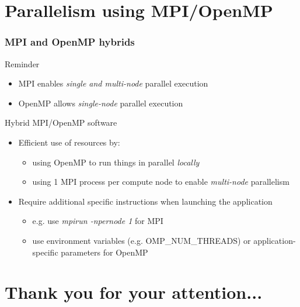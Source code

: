 \documentclass{beamer}
\begin{document}
\section{Parallelism using MPI/OpenMP}

\begin{frame}
  \frametitle{MPI and OpenMP hybrids}
  \vspace{-2ex}
  \begin{block}{Reminder}
    \begin{itemize}
      \item MPI enables \emph{single and multi-node} parallel execution
      \item OpenMP allows \emph{single-node} parallel execution
    \end{itemize}
  \vspace{-2ex}
  \end{block}
  \pause
   \begin{block}{Hybrid MPI/OpenMP software}
      \begin{itemize}
	\item Efficient use of resources by:
	  \begin{itemize}
	    \item using OpenMP to run things in parallel \emph{locally}
	    \item using 1 MPI process per compute node to enable \emph{multi-node} parallelism
	  \end{itemize}
      \pause
	\item Require additional specific instructions when launching the application
	  \begin{itemize}
	    \item e.g. use \emph{mpirun -npernode 1} for MPI
	    \item use environment variables (e.g. OMP\_NUM\_THREADS) or application-specific parameters for OpenMP
	  \end{itemize}
      \end{itemize}
  \vspace{-2ex}
  \end{block}
\end{frame}


\section*{Thank you for your attention...}
\end{document}
